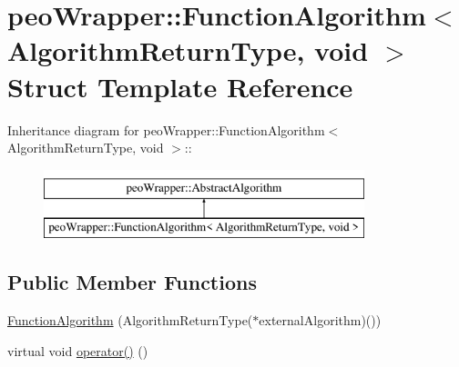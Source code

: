 \hypertarget{structpeoWrapper_1_1FunctionAlgorithm_3_01AlgorithmReturnType_00_01void_01_4}{
\section{peo\-Wrapper::Function\-Algorithm$<$ Algorithm\-Return\-Type, void $>$ Struct Template Reference}
\label{structpeoWrapper_1_1FunctionAlgorithm_3_01AlgorithmReturnType_00_01void_01_4}
}
Inheritance diagram for peo\-Wrapper::Function\-Algorithm$<$ Algorithm\-Return\-Type, void $>$::\begin{figure}[H]
\begin{center}
\leavevmode
\includegraphics[height=2cm]{structpeoWrapper_1_1FunctionAlgorithm_3_01AlgorithmReturnType_00_01void_01_4}
\end{center}
\end{figure}
\subsection*{Public Member Functions}
\begin{CompactItemize}
\item 
\hypertarget{structpeoWrapper_1_1FunctionAlgorithm_3_01AlgorithmReturnType_00_01void_01_4_feb7c5fbc9915b33765ccc8e228f3d6d}{
\hyperlink{structpeoWrapper_1_1FunctionAlgorithm_3_01AlgorithmReturnType_00_01void_01_4_feb7c5fbc9915b33765ccc8e228f3d6d}{Function\-Algorithm} (Algorithm\-Return\-Type($\ast$external\-Algorithm)())}
\label{structpeoWrapper_1_1FunctionAlgorithm_3_01AlgorithmReturnType_00_01void_01_4_feb7c5fbc9915b33765ccc8e228f3d6d}

\item 
\hypertarget{structpeoWrapper_1_1FunctionAlgorithm_3_01AlgorithmReturnType_00_01void_01_4_f9803766fab40ae9dc5930b70ffbadc4}{
virtual void \hyperlink{structpeoWrapper_1_1FunctionAlgorithm_3_01AlgorithmReturnType_00_01void_01_4_f9803766fab40ae9dc5930b70ffbadc4}{operator()} ()}
\label{structpeoWrapper_1_1FunctionAlgorithm_3_01AlgorithmReturnType_00_01void_01_4_f9803766fab40ae9dc5930b70ffbadc4}

\end{CompactItemize}


